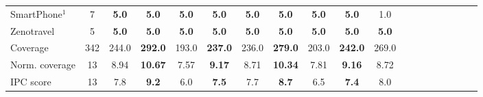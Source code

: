 \begin{tabular}{lccccccccccccccccccl}
SmartPhone$^{1}$ & 7 & \textbf{5.0} & \textbf{5.0} & \textbf{5.0} & \textbf{5.0} & \textbf{5.0} & \textbf{5.0} & \textbf{5.0} & \textbf{5.0} &\multicolumn{2}{c}{ 1.0  } \\ 
Zenotravel & 5 & \textbf{5.0} & \textbf{5.0} & \textbf{5.0} & \textbf{5.0} & \textbf{5.0} & \textbf{5.0} & \textbf{5.0} & \textbf{5.0} &\multicolumn{2}{c}{ \textbf{5.0}  } \\ 
\midrule 
 Coverage & 342 & 244.0 & \textbf{292.0} & 193.0 & \textbf{237.0} & 236.0 & \textbf{279.0} & 203.0 & \textbf{242.0} &\multicolumn{2}{c}{ 269.0  } \\ 
Norm. coverage & 13 & 8.94 & \textbf{10.67} & 7.57 & \textbf{9.17} & 8.71 & \textbf{10.34} & 7.81 & \textbf{9.16} &\multicolumn{2}{c}{ 8.72  } \\ 
IPC score & 13 & 7.8 & \textbf{9.2} & 6.0 & \textbf{7.5} & 7.7 & \textbf{8.7} & 6.5 & \textbf{7.4} &\multicolumn{2}{c}{ 8.0  } \\ 
\bottomrule 
 \end{tabular} 
